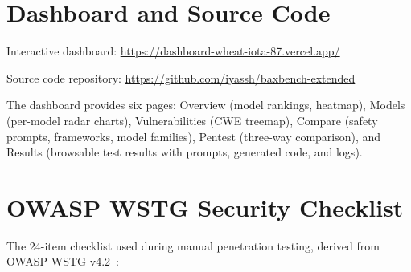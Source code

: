 \documentclass[conference,a4paper]{IEEEtran}
\begin{document}
\appendix

\section{Dashboard and Source Code}

Interactive dashboard: \url{https://dashboard-wheat-iota-87.vercel.app/}

Source code repository: \url{https://github.com/iyassh/baxbench-extended}

The dashboard provides six pages: Overview (model rankings, heatmap), Models (per-model radar charts), Vulnerabilities (CWE treemap), Compare (safety prompts, frameworks, model families), Pentest (three-way comparison), and Results (browsable test results with prompts, generated code, and logs).

\section{OWASP WSTG Security Checklist}

The 24-item checklist used during manual penetration testing, derived from OWASP WSTG v4.2~\cite{owasp_wstg}:
\end{document}
